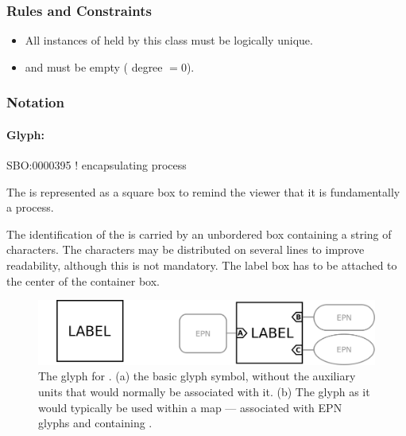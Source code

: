 \begin{logicalkey}
  \item {}
  \item {}
\end{logicalkey}

\subsubsection{Rules and Constraints}

\begin{itemize}
\item All instances of  held by this class
  must be logically unique.
\item {} and  must be empty (\ie
  degree $=0$).
\end{itemize}

\subsubsection{Notation}

\paragraph{Glyph: }

\begin{glyphDescription}

\glyphSboTerm SBO:0000395 ! encapsulating process

\glyphContainer The  is represented as a square box to remind the viewer that it is fundamentally a process.

\glyphLabel The identification of the  is carried by an unbordered box containing a string of characters.  The characters may be distributed on several lines to improve readability, although this is not mandatory.  The label box has to be attached to the center of the container box.

\end{glyphDescription}


\begin{figure}[htb]
  \centering
  \includegraphics[scale = 0.22]{images/submapglyph}
  \caption{The \PD glyph for . (a) the basic glyph
    symbol, without the  auxiliary units that
    would normally be associated with it. (b) The glyph as it would
    typically be used within a map --- associated with EPN glyphs and
    containing .}
  \label{fig:techref:submap}
\end{figure}

